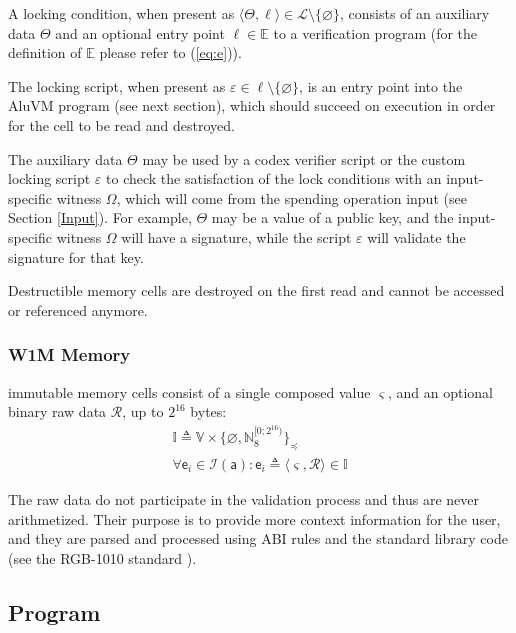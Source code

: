 \documentclass[9pt,oneside]{amsart}
\begin{document}
\begin{multicols}{2}
A locking condition, when present as $\langle \Theta, \ell \rangle \in \mathcal{L} \setminus \{ \varnothing \}$,
consists of an auxiliary data $\Theta$ and an optional entry point $\ell \in \mathbb{E}$ to a verification program
(for the definition of $\mathbb{E}$ please refer to (\ref{eq:e})).

The locking script, when present as $\varepsilon \in \ell \setminus \{ \varnothing \}$,
is an entry point into the AluVM program (see next section),
which should succeed on execution in order for the cell to be read and destroyed.

The auxiliary data $\Theta$ may be used by a codex verifier script or the custom locking script $\varepsilon$
to check the satisfaction of the lock conditions with an input-specific witness $\Omega$,
which will come from the spending operation input (see Section \ref{Input}).
For example, $\Theta$ may be a value of a public key,
and the \gls{input-specific witness} $\Omega$ will have a signature,
while the script $\varepsilon$ will validate the signature for that key.

Destructible memory cells are destroyed on the first read and cannot be accessed or referenced anymore.

\subsubsection{W1M Memory}\label{W1M}

\Gls{immutable memory} cells consist of a single \gls{composed value} $\varsigma$,
and an optional binary raw data $\mathcal{R}$, up to $2^{16}$ bytes:
\noindent
\begin{gather}
\mathbb{I} \triangleq \mathbb{V} \times \{ \varnothing, \mathbb{N}_8^{[0; 2^{16})} \}_\preceq \\
\forall \mathsf{e}_i \in \mathcal{I}(\mathsf{a}) : \mathsf{e}_i \triangleq \langle \varsigma, \mathcal{R} \rangle \in \mathbb{I}
\end{gather}

The raw data do not participate in the validation process and thus are never arithmetized.
Their purpose is to provide more context information for the user, and they are parsed and processed
using ABI rules and the standard library code (see the RGB-1010 standard \cite{RGB1010}).


\subsection{Program}\label{Program}


\end{multicols}
\end{document}
